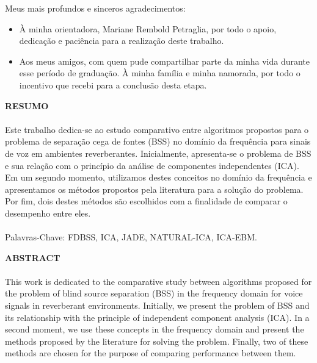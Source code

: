 Meus mais profundos e sinceros agradecimentos:
\begin{itemize}
    \item À minha orientadora, Mariane Rembold Petraglia, por todo o apoio, dedicação e paciência para a realização deste trabalho. 
    \item Aos meus amigos, com quem pude compartilhar parte da minha vida durante esse período de graduação.
    À minha família e minha namorada, por todo o incentivo que recebi para a conclusão desta etapa.
\end{itemize}

\pagebreak


\begin{center}
\textbf{RESUMO}
\end{center}
      \vspace{0.5cm}

\paragraph{}
Este trabalho dedica-se ao estudo comparativo entre algoritmos propostos para o problema de separação cega de fontes (BSS) no domínio da frequência para sinais de voz em ambientes reverberantes. Inicialmente, apresenta-se o problema de BSS e sua relação com o princípio da análise de componentes independentes (ICA). Em um segundo momento, utilizamos destes conceitos no domínio da frequência e apresentamos os métodos propostos pela literatura para a solução do problema. Por fim, dois destes métodos são escolhidos com a finalidade de comparar o desempenho entre eles.

\paragraph{}
\noindent Palavras-Chave: FDBSS, ICA, JADE, NATURAL-ICA, ICA-EBM.

\pagebreak


\begin{center}
\textbf{ABSTRACT}
\end{center}
      \vspace{0.5cm}

\paragraph{}

This work is dedicated to the comparative study between algorithms proposed for the problem of blind source separation (BSS) in the frequency domain for voice signals in reverberant environments. Initially, we present the problem of BSS and its relationship with the principle of independent component analysis (ICA). In a second moment, we use these concepts in the frequency domain and present the methods proposed by the literature for solving the problem. Finally, two of these methods are chosen for the purpose of comparing performance between them.

